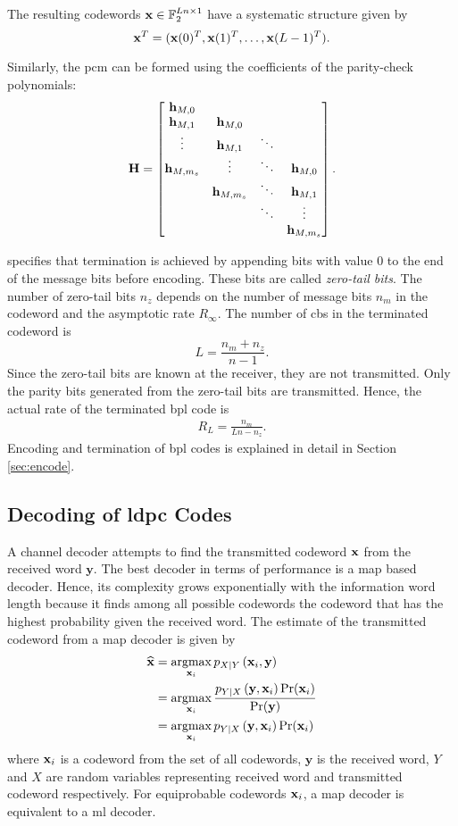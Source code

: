 The resulting codewords $\mathbf{x}\in\mathbb{F}_2^{Ln\times 1}$ have a systematic structure given by $$\mathbf{x}^T=(\mathbf{x}(0)^T,\mathbf{x}(1)^T,\dots,\mathbf{x}(L-1)^T).$$

Similarly, the \ac{pcm} can be formed using the coefficients of the parity-check polynomials:
\begin{align}\label{eq:bpl_pcm}
\mathbf{H}=
\begin{bmatrix}
\mathbf{h}_{M,0}\\
\mathbf{h}_{M,1} &\mathbf{h}_{M,0}\\
\vdots &\mathbf{h}_{M,1} &\ddots\\
\mathbf{h}_{M,m_s} &\vdots &\ddots &\mathbf{h}_{M,0}\\
&\mathbf{h}_{M,m_s} &\ddots &\mathbf{h}_{M,1}\\
& &\ddots &\vdots\\
& & &\mathbf{h}_{M,m_s}
\end{bmatrix}.
\end{align}

\cite{Bpl} specifies that termination is achieved by appending bits with value $0$ to the end of the message bits before encoding. These bits are called \emph{zero-tail bits}. The number of zero-tail bits $n_z$ depends on the number of message bits $n_m$ in the codeword and the asymptotic rate $R_\infty$. The number of \acp{cb} in the terminated codeword is $$L=\frac{n_m+n_z}{n-1}.$$ Since the zero-tail bits are known at the receiver, they are not transmitted. Only the parity bits generated from the zero-tail bits are transmitted. Hence, the actual rate of the terminated \ac{bpl} code is
\begin{align}\label{eq:rate_term}
R_L=\frac{n_m}{Ln-n_z}.
\end{align}
Encoding and termination of \ac{bpl} codes is explained in detail in Section \ref{sec:encode}.

\subsection{Decoding of \acl{ldpc} Codes}\label{sec:decoding_ldpc}
A channel decoder attempts to find the transmitted codeword $\mathbf{x}$ from the received word $\mathbf{y}$. The best decoder in terms of performance is a \ac{map} based decoder. Hence, its complexity grows exponentially with the information word length because it finds among all possible codewords the codeword that has the highest probability given the received word. The estimate of the transmitted codeword from a \ac{map} decoder is given by
\begin{align}
\widehat{\mathbf{x}}&=\operatorname*{argmax}_{\mathbf{x}_i}p_{X\mid Y}\left(\mathbf{x}_i,\mathbf{y}\right) \nonumber\\
&=\operatorname*{argmax}_{\mathbf{x}_i}\frac{p_{Y\mid X}\left(\mathbf{y},\mathbf{x}_i\right)\text{Pr}(\mathbf{x}_i)}{\text{Pr}(\mathbf{y})} \nonumber\\
&=\operatorname*{argmax}_{\mathbf{x}_i}p_{Y\mid X}\left(\mathbf{y},\mathbf{x}_i\right)\text{Pr}(\mathbf{x}_i)
\end{align}
where $\mathbf{x}_i$ is a codeword from the set of all codewords, $\mathbf{y}$ is the received word, $Y$ and $X$ are random variables representing received word and transmitted codeword respectively. For equiprobable codewords $\mathbf{x}_i$, a \ac{map} decoder is equivalent to a \ac{ml} decoder.

